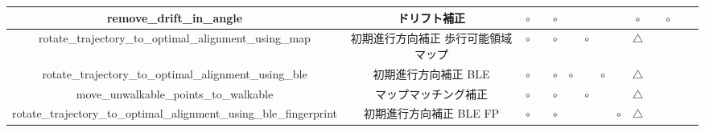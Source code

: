 \begin{table}[ht]
{\begin{tabular}{|c|c|c|c|c|c|c|c|c|c|c|c|c|c|}
			remove\_drift\_in\_angle                                           & ドリフト補正              & \multicolumn{1}{c|}{$\circ$} &                              & \multicolumn{1}{c|}{$\circ$} &                              &                                                                                                                                             &                              &                                  & \multicolumn{1}{c|}{$\circ$}     &    & \multicolumn{1}{c|}{$\circ$} &    \\ \hline
			rotate\_trajectory\_to\_optimal\_alignment\_using\_map             &  初期進行方向補正 歩行可能領域マップ & \multicolumn{1}{c|}{$\circ$} &                              & \multicolumn{1}{c|}{$\circ$} &                              & \multicolumn{1}{c|}{$\circ$}                                                                                                                &                              &                                  & \multicolumn{1}{c|}{$\triangle$} &    &                              &    \\ \hline
			rotate\_trajectory\_to\_optimal\_alignment\_using\_ble             &  初期進行方向補正 BLE       & \multicolumn{1}{c|}{$\circ$} &                              & \multicolumn{1}{c|}{$\circ$} & \multicolumn{1}{c|}{$\circ$} &                                                                                                                                             & \multicolumn{1}{c|}{$\circ$} &                                  & \multicolumn{1}{c|}{$\triangle$} &    &                              &    \\ \hline
			move\_unwalkable\_points\_to\_walkable                             &  マップマッチング補正        & \multicolumn{1}{c|}{$\circ$} &                              & \multicolumn{1}{c|}{$\circ$} &                              & \multicolumn{1}{c|}{$\circ$}                                                                                                                &                              &                                  & \multicolumn{1}{c|}{$\triangle$} &    &                              &    \\ \hline
	rotate\_trajectory\_to\_optimal\_alignment\_using\_ble\_fingerprint
		& 	初期進行方向補正 BLE FP    		                   & \multicolumn{1}{c|}{$\circ$}                                        &                              & \multicolumn{1}{c|}{$\circ$} &                                                            &                              &                                                                                                               & \multicolumn{1}{c|}{$\circ$} & \multicolumn{1}{c|}{$\triangle$} &                                  &    &                                   \\ \hline
		\end{tabular}
	}
\end{table}



